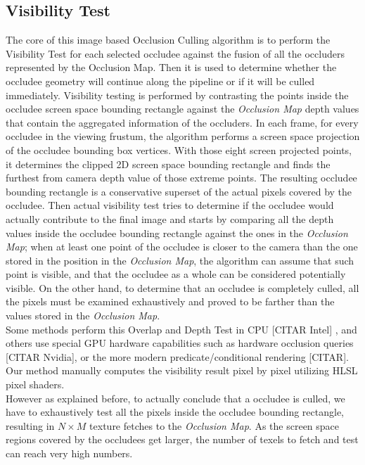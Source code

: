\documentclass[10pt, conference]{IEEEtran}
\begin{document}
\subsection{Visibility Test}
%
The core of this image based Occlusion Culling algorithm is to perform the Visibility Test for each selected occludee against the fusion of all the occluders represented by the Occlusion Map. 
Then it is used to determine whether the occludee geometry will continue along the pipeline or if it will be culled immediately.
Visibility testing is performed by contrasting the points inside the occludee screen space bounding rectangle against the \emph{Occlusion Map} depth values that contain the aggregated information of the occluders.  
In each frame, for every occludee in the viewing frustum, the algorithm performs a screen space projection of the occludee bounding box vertices. 
With those eight screen projected points, it determines the clipped 2D screen space bounding rectangle and finds the furthest from camera depth value of those extreme points. 
The resulting occludee bounding rectangle is a conservative superset of the actual pixels covered by the occludee. 
Then actual visibility test tries to determine if the occludee would actually contribute to the final image and starts by comparing all 
the depth values inside the occludee bounding rectangle against the ones in the \emph{Occlusion Map}; when at least one point of the occludee 
is closer to the camera than the one stored in the position in the \emph{Occlusion Map}, the algorithm can assume that such point is visible, 
and that the occludee as a whole can be considered potentially visible. 
On the other hand, to determine that an occludee is completely culled, all the pixels must be examined exhaustively and proved to be farther than the values stored in the \emph{Occlusion Map}.\\
 
Some methods perform this Overlap and Depth Test in CPU \cite{frostbite} [CITAR Intel] \cite{lazy_occlusion_grid} \cite{cacic_occlusion_2},  
and others use special GPU hardware capabilities such as hardware occlusion queries [CITAR Nvidia], \cite{occlusion_queries} or the more modern 
predicate/conditional rendering [CITAR]. 
Our method manually computes the visibility result pixel by pixel utilizing HLSL pixel shaders.\\

However as explained before, to actually conclude that a occludee is culled, we have to exhaustively test all the pixels inside the occludee bounding 
rectangle, resulting in $N \times M$ texture fetches to the \emph{Occlusion Map}. 
As the screen space regions covered by the occludees get larger, the number of texels to fetch and test can reach very high numbers.\\
\end{document}
